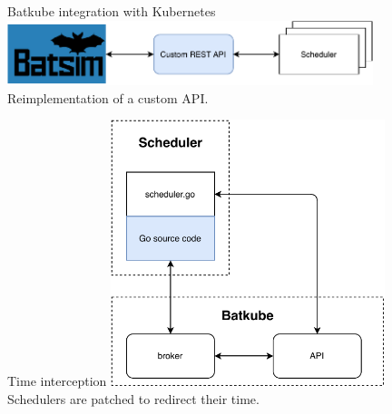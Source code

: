 \documentclass[12pt, aspectratio=43]{beamer}
\begin{document}
\appendix
\begin{frame}{Batkube integration with Kubernetes}
	\centering
	\includegraphics[width=0.8\textwidth]{../imgs/custom-api.pdf}\\
	\small{Reimplementation of a custom API.}
\end{frame}

\begin{frame}{Time interception}
	\centering
	\includegraphics[width=0.6\textwidth]{../imgs/synchro-go-sources.pdf}\\
	\small{Schedulers are patched to redirect their time.}
\end{frame}
\end{document}
